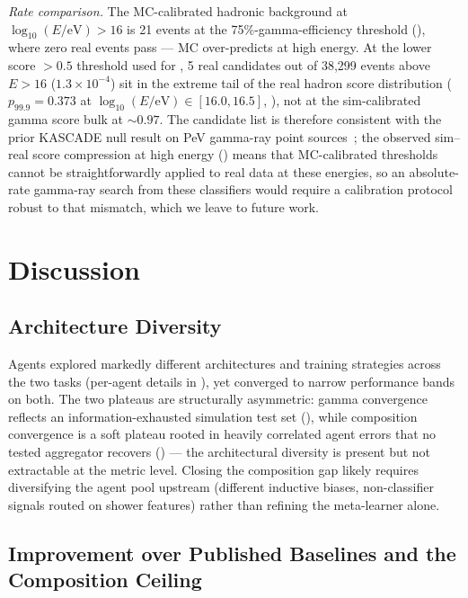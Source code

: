 \documentclass[universe,article,submit,pdftex,oneauthor]{Definitions/mdpi}
\begin{document}
\emph{Rate comparison.} The MC-calibrated hadronic background at $\log_{10}(E/\mathrm{eV}) > 16$ is 21 events at the 75\%-gamma-efficiency threshold (), where zero real events pass --- MC over-predicts at high energy. At the lower score $> 0.5$ threshold used for , 5 real candidates out of 38{,}299 events above $E > 16$ ($1.3 \times 10^{-4}$) sit in the extreme tail of the real hadron score distribution ($p_{99.9} = 0.373$ at $\log_{10}(E/\mathrm{eV}) \in [16.0, 16.5]$, ), not at the sim-calibrated gamma score bulk at ${\sim}0.97$. The candidate list is therefore consistent with the prior KASCADE null result on PeV gamma-ray point sources~\cite{kascade_icrc}; the observed sim--real score compression at high energy () means that MC-calibrated thresholds cannot be straightforwardly applied to real data at these energies, so an absolute-rate gamma-ray search from these classifiers would require a calibration protocol robust to that mismatch, which we leave to future work.

\section{Discussion}
\label{sec:discussion}

\subsection{Architecture Diversity}

Agents explored markedly different architectures and training strategies across the two tasks (per-agent details in ), yet converged to narrow performance bands on both. The two plateaus are structurally asymmetric: gamma convergence reflects an information-exhausted simulation test set (), while composition convergence is a soft plateau rooted in heavily correlated agent errors that no tested aggregator recovers () --- the architectural diversity is present but not extractable at the metric level. Closing the composition gap likely requires diversifying the agent pool upstream (different inductive biases, non-classifier signals routed on shower features) rather than refining the meta-learner alone.

\subsection{Improvement over Published Baselines and the Composition Ceiling}
\end{document}
